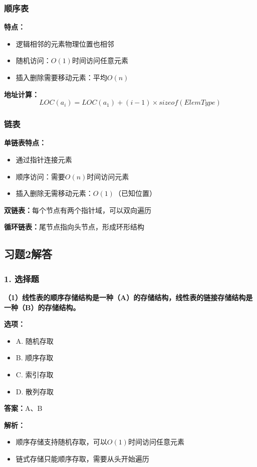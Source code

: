 \documentclass[12pt,a4paper]{amsart}
\begin{document}
\subsubsection{顺序表}
\textbf{特点：}
\begin{itemize}
\item 逻辑相邻的元素物理位置也相邻
\item 随机访问：$O(1)$时间访问任意元素
\item 插入删除需要移动元素：平均$O(n)$
\end{itemize}

\textbf{地址计算：}
$$LOC(a_i) = LOC(a_1) + (i-1) \times sizeof(ElemType)$$

\subsubsection{链表}
\textbf{单链表特点：}
\begin{itemize}
\item 通过指针连接元素
\item 顺序访问：需要$O(n)$时间访问元素
\item 插入删除无需移动元素：$O(1)$（已知位置）
\end{itemize}

\textbf{双链表：}每个节点有两个指针域，可以双向遍历

\textbf{循环链表：}尾节点指向头节点，形成环形结构

\subsection{习题2解答}

\subsubsection{1. 选择题}

\textbf{（1）线性表的顺序存储结构是一种（A）的存储结构，线性表的链接存储结构是一种（B）的存储结构。}

\textbf{选项：}
\begin{itemize}
\item A. 随机存取
\item B. 顺序存取
\item C. 索引存取
\item D. 散列存取
\end{itemize}

\textbf{答案：}A、B

\textbf{解析：}
\begin{itemize}
\item 顺序存储支持随机存取，可以$O(1)$时间访问任意元素
\item 链式存储只能顺序存取，需要从头开始遍历
\end{itemize}
\end{document}
